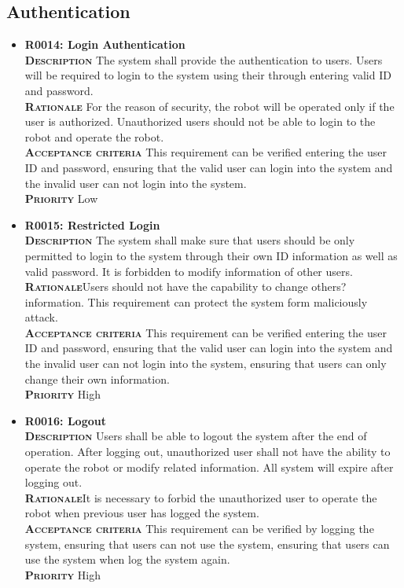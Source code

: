 \documentclass[11pt, a4paper]{article}
\begin{document}
\subsection{Authentication}
\begin{itemize}
\item {\bfseries R0014: Login Authentication}\\
\textsc{\bfseries Description} The system shall provide the authentication to users. Users will be required to login to the system using their through entering valid ID and password.\\
\textsc{\bfseries Rationale} For the reason of security, the robot will be operated only if the user is authorized. Unauthorized users should not be able to login to the robot and operate the robot.\\
\textsc{\bfseries Acceptance criteria} This requirement can be verified entering the user ID and password, ensuring that the valid user can login into the system and the invalid user can not login into the system.\\
\textsc{\bfseries Priority} Low\\

\item {\bfseries R0015: Restricted Login}\\
\textsc{\bfseries Description}  The system shall make sure that users should be only permitted to login to the system through their own ID information as well as valid password. It is forbidden to modify information of other users.\\
\textsc{\bfseries Rationale}Users should not have the capability to change others? information. This requirement can protect the system form maliciously attack.\\
\textsc{\bfseries Acceptance criteria} This requirement can be verified entering the user ID and password, ensuring that the valid user can login into the system and the invalid user can not login into the system, ensuring that users can only change their own information.\\
\textsc{\bfseries Priority} High\\

\item {\bfseries R0016: Logout}\\
\textsc{\bfseries Description} Users shall be able to logout the system after the end of operation. After logging out, unauthorized user shall not have the ability to operate the robot or modify related information. All system will expire after logging out.\\
\textsc{\bfseries Rationale}It is necessary to forbid the unauthorized user to operate the robot when previous user has logged the system.\\
\textsc{\bfseries Acceptance criteria} This requirement can be verified by logging the system, ensuring that users can not use the system, ensuring that users can use the system when log the system again.\\
\textsc{\bfseries Priority} High\\
\end{itemize}
\end{document}
